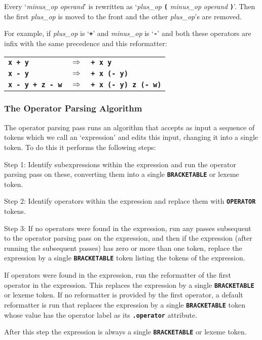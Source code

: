 \documentclass[12pt]{article}
\newcommand{\TT}[1]{{\tt \bfseries #1}}
\newenvironment{indpar}[1][0.3in]%
	{\begin{list}{}%
		     {\setlength{\itemsep}{0in}%
		      \setlength{\topsep}{0in}%
		      \setlength{\parsep}{1ex}%
		      \setlength{\labelwidth}{#1}%
		      \setlength{\leftmargin}{#1}%
		      \addtolength{\leftmargin}{\labelsep}}%
	 \item}%
	{\end{list}}
\newenvironment{itemlist}[1][1.2in]%
	{\begin{list}{}{\setlength{\labelwidth}{#1}%
		        \setlength{\leftmargin}{\labelwidth}%
		        \addtolength{\leftmargin}{+0.2in}%
		        \renewcommand{\makelabel}[1]{##1\hfill}}}%
	{\end{list}}
\begin{document}
\begin{indpar}[1em]
\begin{indpar}[0.5em]
Every `{\em minus\_op} {\em operand}' is rewritten as
`{\em plus\_op} \TT{(} {\em minus\_op} {\em operand} \TT{)}'.
Then the first {\em plus\_op} is moved to the front and the other
{\em plus\_op}'s are removed.

For example, if {\em plus\_op} is `\TT{+}' and {\em minus\_op} is
`\TT{-}' and both these operators are infix with the same precedence
and this reformatter:

\hspace*{2em}\begin{tabular}{lcl}
\TT{x + y} & $\Longrightarrow$ & \TT{+ x y} \\
\TT{x - y} & $\Longrightarrow$ & \TT{+ x (- y)} \\
\TT{x - y + z - w} & $\Longrightarrow$ & \TT{+ x (- y) z (- w)} \\
\end{tabular}

\end{indpar}

\bigskip

\end{indpar}


\subsubsection{The Operator Parsing Algorithm}
\label{OPERATOR-PARSER-ALGORITHM}


The operator parsing pass runs an
algorithm that accepts as input a sequence of tokens
which we call an `expression'
and edits this input, changing it into a single token.
To do this it performs the following steps:
\begin{itemlist}[0.7in]
\item[Step 1:] Identify subexpressions within the expression and run the
operator parsing pass on these, converting them into a single
\TT{BRACKETABLE} or lexeme token.
\item[Step 2:] Identify operators within the expression and replace them
with \TT{OPERATOR} tokens.
\item[Step 3:] If no operators were found in the expression,
run any passes subsequent to the operator parsing pass on the expression,
and then if the expression (after running the subsequent passes)
has zero or more than one
token, replace the expression by a single \TT{BRACKETABLE} token listing the
tokens of the expression.

If operators were found in the expression,
run the reformatter of the first operator
in the expression.  This replaces the expression by a single
\TT{BRACKETABLE} or lexeme token.
If no reformatter is provided by the first operator, a default
reformatter is run that replaces the expression by a single \TT{BRACKETABLE}
token whose value has the operator label as its \TT{.operator} attribute.

After this step the expression is always a single \TT{BRACKETABLE} or
lexeme token.
\end{itemlist}
\end{document}
